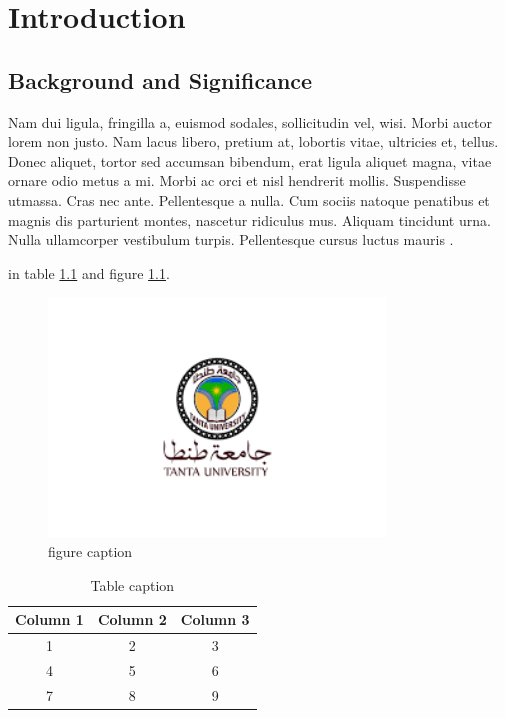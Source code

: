 \chapter{Introduction} \label{chapter1}

\thispagestyle{empty}

\section{Background and Significance}

Nam dui ligula, fringilla a, euismod sodales, sollicitudin vel, wisi. Morbi auctor lorem non justo. Nam lacus libero, pretium at, lobortis vitae, ultricies et, tellus. Donec aliquet, tortor sed accumsan bibendum, erat ligula aliquet magna, vitae ornare odio metus a mi. Morbi ac orci et nisl hendrerit mollis. Suspendisse utmassa. Cras nec ante. Pellentesque a nulla. Cum sociis natoque penatibus et magnis dis parturient montes, nascetur ridiculus mus. Aliquam tincidunt urna. Nulla ullamcorper vestibulum turpis. Pellentesque cursus luctus mauris \cite{Elkholy2018}.


in table \ref{tab:table_caption} and figure \ref{fig:fig_caption}.


\begin{figure}[h!]
    \centering
    \includegraphics[width=0.8\textwidth]{figs/image.png}
    \caption{figure caption}
    \label{fig:fig_caption}
\end{figure}

\begin{table}
    \centering
    \caption{Table caption}
    \label{tab:table_caption}
    \begin{tabular}{ccc}
        \hline
        \textbf{Column 1} & \textbf{Column 2} & \textbf{Column 3} \\
        \hline
        \hline
        1 & 2 & 3 \\
        4 & 5 & 6 \\
        7 & 8 & 9 \\
        \hline
    \end{tabular}
\end{table}




